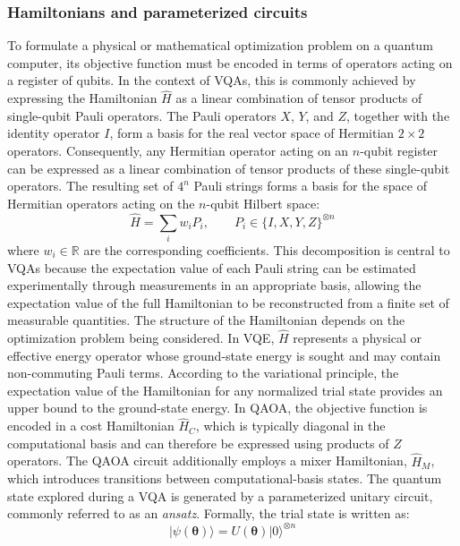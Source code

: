 \subsubsection{Hamiltonians and parameterized circuits}
To formulate a physical or mathematical optimization problem on a quantum computer, its objective function must be encoded in terms of operators acting on a register of qubits. In the context of VQAs, this is commonly achieved by expressing the Hamiltonian $\hat{H}$ as a linear combination of tensor products of single-qubit Pauli operators.
The Pauli operators $X$, $Y$, and $Z$, together with the identity operator $I$, form a basis for the real vector space of Hermitian $2\times2$ operators. Consequently, any Hermitian operator acting on an $n$-qubit register can be expressed as a linear combination of tensor products of these single-qubit operators. The resulting set of $4^n$ Pauli strings forms a basis for the space of Hermitian operators acting on the $n$-qubit Hilbert space:
\begin{equation}
\hat{H} = \sum_i w_i P_i,
\qquad
P_i\in\{I,X,Y,Z\}^{\otimes n}
\end{equation}
where $w_i\in\mathbb{R}$ are the corresponding coefficients. This decomposition is central to VQAs because the expectation value of each Pauli string can be estimated experimentally through measurements in an appropriate basis, allowing the expectation value of the full Hamiltonian to be reconstructed from a finite set of measurable quantities.
The structure of the Hamiltonian depends on the optimization problem being considered. In VQE, $\hat{H}$ represents a physical or effective energy operator whose ground-state energy is sought and may contain non-commuting Pauli terms. According to the variational principle, the expectation value of the Hamiltonian for any normalized trial state provides an upper bound to the ground-state energy. In QAOA, the objective function is encoded in a cost Hamiltonian $\hat{H}_C$, which is typically diagonal in the computational basis and can therefore be expressed using products of $Z$ operators. The QAOA circuit additionally employs a mixer Hamiltonian, $\hat{H}_M$, which introduces transitions between computational-basis states.
The quantum state explored during a VQA is generated by a parameterized unitary circuit, commonly referred to as an \textit{ansatz}. Formally, the trial state is written as:
\begin{equation}
|\psi(\boldsymbol{\theta})\rangle = U(\boldsymbol{\theta})|0\rangle^{\otimes n}
\end{equation}
